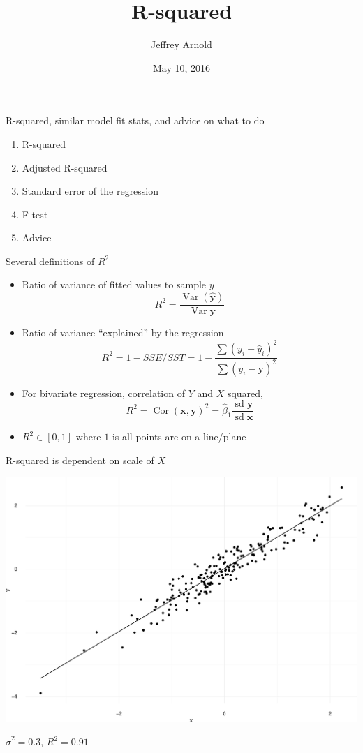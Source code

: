 \documentclass[ignorenonframetext,]{beamer}
\title{R-squared}
\author{Jeffrey Arnold}
\date{May 10, 2016}
\providecommand{\tightlist}{%
  \setlength{\itemsep}{0pt}\setlength{\parskip}{0pt}}
\DeclareMathOperator{\Var}{Var}
\DeclareMathOperator{\Cor}{Cor}
\DeclareMathOperator{\sd}{sd}
\renewcommand{\vec}[1]{\boldsymbol{#1}}
\begin{document}
\frame{\titlepage}

\begin{frame}{R-squared, similar model fit stats, and advice on what to
do}

\begin{enumerate}
\def\labelenumi{\arabic{enumi}.}
\tightlist
\item
  R-squared
\item
  Adjusted R-squared
\item
  Standard error of the regression
\item
  F-test
\item
  Advice
\end{enumerate}

\end{frame}

\begin{frame}{Several definitions of \(R^2\)}

\begin{itemize}
\item
  Ratio of variance of fitted values to sample \(y\) \[
  R^2 = \frac{\Var(\hat{\vec{y}})}{\Var{\vec{y}}}
  \]
\item
  Ratio of variance ``explained'' by the regression \[
  R^2 = 1 - SSE / SST = 1 - \frac{\sum (y_i - \hat{y}_i)^2}{\sum (y_i - \bar{\vec{y}})^2}
  \]
\item
  For bivariate regression, correlation of \(Y\) and \(X\) squared, \[
  R^2 = \Cor(\vec{x}, \vec{y})^2 = \hat{\beta}_1 \frac{\sd{\vec{y}}}{\sd{\vec{x}}}
  \]
\item
  \(R^2 \in [0, 1]\) where \(1\) is all points are on a line/plane
\end{itemize}

\end{frame}

\begin{frame}{R-squared is dependent on scale of \(X\)}

\includegraphics{r2_regression_fit_files/figure-beamer/unnamed-chunk-2-1.pdf}

\(\hat{\sigma}^2 = 0.3\), \(R^2 = 0.91\)

\end{frame}
\end{document}
